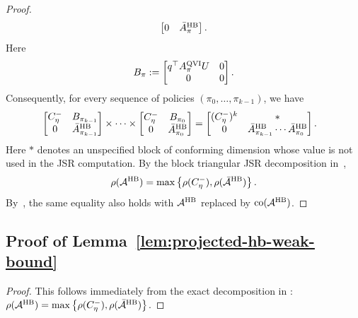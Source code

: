 \documentclass[letterpaper]{article}
\numberwithin{equation}{section}
\newcommand{\co}{\operatorname{co}}
\begin{document}
\begin{proof}
\begin{equation*}
\begin{aligned}
\begin{bmatrix}
    0&\bar A_\pi^{\rm HB}
  \end{bmatrix}.
\end{aligned}
\end{equation*}
Here
\begin{equation*}
  B_\pi:=
  \begin{bmatrix}
    q^\top A_\pi^{\rm QVI}U&0\\
    0&0
  \end{bmatrix}.
\end{equation*}
Consequently, for every sequence of policies $(\pi_0,\ldots,\pi_{k-1})$, we have
\begin{equation*}
\begin{aligned}
&\begin{bmatrix}
    C_\eta^-&B_{\pi_{k-1}}\\
    0&\bar A_{\pi_{k-1}}^{\rm HB}
  \end{bmatrix}
  \times \cdots \times
  \begin{bmatrix}
    C_\eta^-&B_{\pi_0}\\
    0&\bar A_{\pi_0}^{\rm HB}
  \end{bmatrix} =  \begin{bmatrix}
    (C_\eta^-)^k&*\\
    0&\bar A_{\pi_{k-1}}^{\rm HB}\cdots
      \bar A_{\pi_0}^{\rm HB}
  \end{bmatrix}.
\end{aligned}
\end{equation*}
Here $*$ denotes an unspecified block of conforming dimension whose value is not
used in the JSR computation.
By the block triangular JSR decomposition in~,
\begin{align*}
  \rho(\mathcal A^{\rm HB})=
  \max\left\{\rho(C_\eta^-),\rho(\bar{\mathcal A}^{\rm HB})\right\}.
\end{align*}
By~, the same equality also holds with
$\mathcal A^{\rm HB}$ replaced by $\co(\mathcal A^{\rm HB})$.
\end{proof}

\subsection{Proof of Lemma~\ref{lem:projected-hb-weak-bound}}
\label{app:proof-lem-projected-hb-weak-bound}

\begin{proof}
This follows immediately from the exact decomposition in
: $\rho(\mathcal A^{\rm HB})
  =\max\left\{\rho(C_\eta^-),\rho(\bar{\mathcal A}^{\rm HB})\right\}$.
\end{proof}
\end{document}
